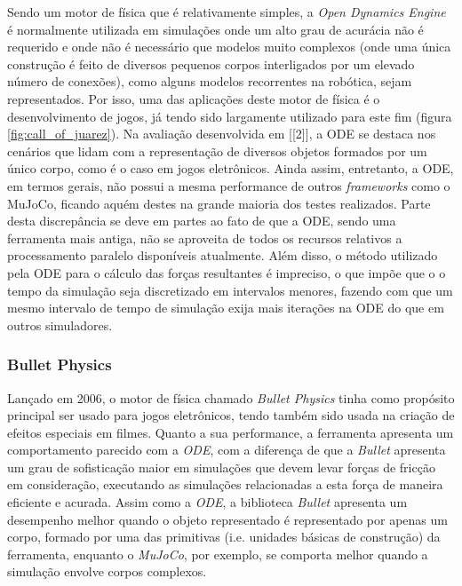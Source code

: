 \documentclass[cic,tc]{iiufrgs}
\begin{document}
Sendo um motor de física que é relativamente simples, a \textit{Open Dynamics
Engine} é normalmente utilizada em simulações onde um alto grau de acurácia não
é requerido e onde não é necessário que modelos muito complexos (onde uma única
construção é feito de diversos pequenos corpos interligados por um elevado
número de conexões), como alguns modelos recorrentes na robótica, sejam
representados. Por isso, uma das aplicações deste motor de física é o
desenvolvimento de jogos, já tendo sido largamente utilizado para este fim
(figura \ref{fig:call_of_juarez}). Na avaliação desenvolvida em [[2]], a ODE se
destaca nos cenários que lidam com a representação de diversos objetos formados
por um único corpo, como é o caso em jogos eletrônicos. Ainda
assim, entretanto, a ODE, em termos gerais, não possui a mesma performance de
outros \textit{frameworks} como o MuJoCo, ficando aquém destes na grande maioria
dos testes realizados. Parte desta discrepância se deve em partes ao fato de
que a ODE, sendo uma ferramenta mais antiga, não se aproveita de todos os
recursos relativos a processamento paralelo disponíveis atualmente. Além disso,
o método utilizado pela ODE para o cálculo das forças resultantes é impreciso,
o que impõe que o o tempo da simulação seja discretizado em intervalos menores,
fazendo com que um mesmo intervalo de tempo de simulação exija mais iterações
na ODE do que em outros simuladores.


\subsubsection{Bullet Physics}


Lançado em 2006, o motor de física chamado \textit{Bullet Physics} tinha como
propósito principal ser usado para jogos eletrônicos, tendo também sido usada
na criação de efeitos especiais em filmes. Quanto a sua performance, a
ferramenta apresenta um comportamento parecido com a \textit{ODE}, com a
diferença de que a \textit{Bullet} apresenta um grau de sofisticação maior em
simulações que devem levar forças de fricção em consideração, executando as
simulações relacionadas a esta força de maneira eficiente e acurada. Assim como
a \textit{ODE}, a biblioteca \textit{Bullet} apresenta um desempenho melhor
quando o objeto representado é representado por apenas um corpo, formado por uma
das primitivas (i.e. unidades básicas de construção) da ferramenta, enquanto o
\textit{MuJoCo}, por exemplo, se comporta melhor quando a simulação envolve
corpos complexos.
\end{document}
